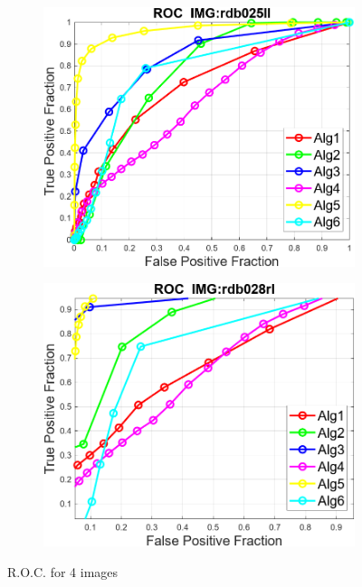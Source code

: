 \documentclass[a4paper, 11pt]{article}
\begin{document}
\begin{figure}[hbt!]
\medskip %
\begin{subfigure}{.4\linewidth}
  \includegraphics[width=\linewidth]{src/rdb025ll.png}
  \caption{}
  \label{velcomp}
\end{subfigure}\hfill %
\begin{subfigure}{.4\linewidth}
  \includegraphics[width=\linewidth]{src/rdb028rl.png}
  \caption{}
  \label{estcomp}
\end{subfigure}

\caption{R.O.C. for 4 images}
\label{fig:roc}
\end{figure}
\end{document}
